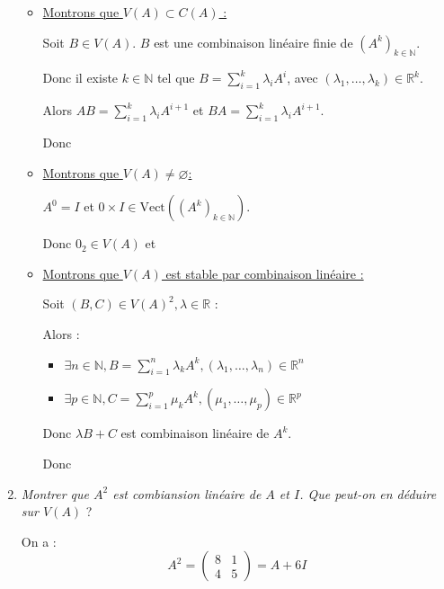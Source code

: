 \documentclass[11pt]{article}
\newcommand{\N}{\mathbb{N}}
\newcommand{\R}{\mathbb{R}}
\begin{document}
\begin{enumerate}
		\begin{itemize}
			\renewcommand{\labelitemi}{$\circ$}
			\item \underline{Montrons que \(V(A) \subset C(A)\) :}
			
			 Soit \(B \in V(A)\). \(B\) est une combinaison linéaire finie de \((A^k)_{k\in \N}\). 
			
			Donc il existe \(k \in \N\) tel que \(B = \sum\limits_{i=1}^{k} \lambda_i A^i\), avec \((\lambda_1, \dots, \lambda_k) \in \R^k\).
			
			Alors \(AB = \sum\limits_{i=1}^k \lambda_i A^{i+1}\) et \(BA = \sum\limits_{i=1}^k \lambda_i A^{i+1}\).
			
			Donc 
			
			\medskip
			
			\item \underline{Montrons que \(V(A) \neq \varnothing\):}
			
			\(A^0 = I\) et \(0 \times I \in \text{Vect}((A^k)_{k\in \N})\).
			
			Donc \(0_2 \in V(A)\) et 
			
			\item \underline{Montrons que \(V(A)\) est stable par combinaison linéaire :}
			
			Soit \((B, C) \in V(A)^2, \lambda \in \R\) :
			
			Alors :
			\begin{itemize}
				\item \(\exists n \in \N, B = \sum\limits_{i=1}^n \lambda_k A^k, (\lambda_1, \dots, \lambda_n) \in \R^n\)
				\item \(\exists p \in \N, C = \sum\limits_{i=1}^p \mu_k A^k, (\mu_1, \dots, \mu_p) \in \R^p\)
			\end{itemize}
		
			Donc \(\lambda B + C\) est combinaison linéaire de \(A^k\).
			
			Donc 
		\end{itemize}
		\newpage
	
		\item {\large\textit{Montrer que \(A^2\) est combiansion linéaire de \(A\) et \(I\). Que peut-on en déduire sur \(V(A)\)} ?} 
		
		On a : 
		\[
			A^2 = \begin{pmatrix}
				8 & 1\\
				4 & 5
			\end{pmatrix} = A + 6I
		\]
		

\end{enumerate}
\end{document}
